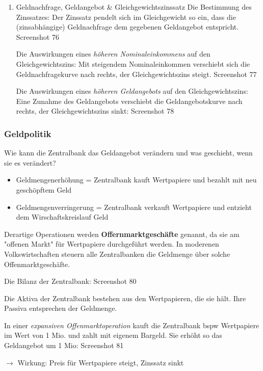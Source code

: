 \documentclass[11pt]{article}
\begin{document}
\begin{enumerate}
\item Geldnachfrage, Geldangebot \& Gleichgewichtszinssatz
\label{sec:org8f75da6}
Die Bestimmung des Zinssatzes: Der Zinssatz pendelt sich im Gleichgewicht so ein, dass die (zinsabhängige) Geldnachfrage dem gegebenen Geldangebot entspricht. Screenshot 76

Die Auswirkungen eines \emph{höheren Nominaleinkommens} auf den Gleichgewichtszins: Mit steigendem Nominaleinkommen verschiebt sich die Geldnachfragekurve nach rechts, der Gleichgewichtszins steigt. Screenshot 77

Die Auswirkungen eines \emph{höheren Geldangebots} auf den Gleichgewichtszins: Eine Zunahme des Geldangebots verschiebt die Geldangebotskurve nach rechts, der Gleichgewichtszins sinkt: Screenshot 78
\end{enumerate}

\subsubsection{Geldpolitik}
\label{sec:org84d69bc}
Wie kann die Zentralbank das Geldangebot verändern und was geschieht, wenn sie es verändert?
\begin{itemize}
\item Geldmengenerhöhung = Zentralbank kauft Wertpapiere und bezahlt mit neu geschöpftem Geld
\item Geldmengenverringerung = Zentralbank verkauft Wertpapiere und entzieht dem Wirschaftskreislauf Geld
\end{itemize}

Derartige Operationen werden \textbf{Offernmarktgeschäfte} genannt, da sie am "offenen Markt" für Wertpapiere durchgeführt werden.
In moderenen Volkswirtschaften steuern alle Zentralbanken die Geldmenge über solche Offenmarktgeschäfte.

Die Bilanz der Zentralbank: Screenshot 80

Die Aktiva der Zentralbank bestehen aus den Wertpapieren, die sie hält. Ihre Passiva entsprechen der Geldmenge.

In einer \emph{expansiven Offenmarktoperation} kauft die Zentralbank bspw Wertpapiere im Wert von 1 Mio.\texteuro{} und zahlt mit eigenem Bargeld. Sie erhöht so das Geldangebot um 1 Mio\texteuro{}:
Screenshot 81

\(\rightarrow\) Wirkung: Preis für Wertpapiere steigt, Zinssatz sinkt
\end{document}
